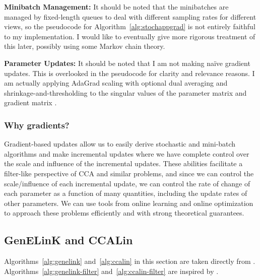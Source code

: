 \documentclass{article}
\begin{document}
	\noindent \textbf{Minibatch Management:} It should be noted that the minibatches are managed by fixed-length queues to deal with different sampling rates for different views, so the pseudocode for Algorithm~\ref{alg:stochappgrad} is not entirely faithful to my implementation. I would like to eventually give more rigorous treatment of this later, possibly using some Markov chain theory.
	
	\noindent \textbf{Parameter Updates:} It should be noted that I am not making na\"{i}ve gradient updates. This is overlooked in the pseudocode for clarity and relevance reasons. I am actually applying AdaGrad scaling with optional dual averaging and shrinkage-and-thresholding to the singular values of the parameter matrix and gradient matrix \citep{duchi2011adaptive}.
	
	\subsubsection{Why gradients?} \label{subsubsec:whygradients}
	Gradient-based updates allow us to easily derive stochastic and mini-batch algorithms and make incremental updates where we have complete control over the scale and influence of the incremental updates. These abilities facilitate a filter-like perspective of CCA and similar problems, and since we can control the scale/influence of each incremental update, we can control the rate of change of each parameter as a function of many quantities, including the update rates of other parameters. We can use tools from online learning and online optimization to approach these problems efficiently and with strong theoretical guarantees.
	
	\subsection{GenELinK and CCALin} \label{subsec:genelinkandccalin}
	
	Algorithms~\ref{alg:genelink} and~\ref{alg:ccalin} in this section are taken directly from \cite{ge2016efficient}. Algorithms~\ref{alg:genelink-filter} and~\ref{alg:ccalin-filter} are inspired by \cite{ge2016efficient}.
	
\end{document}
